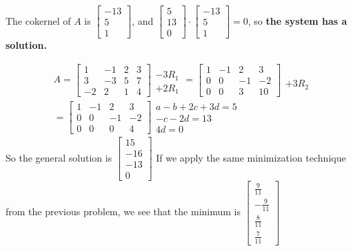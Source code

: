 \documentclass[10pt,letterpaper]{article}
\begin{document}
	The cokernel of $A$ is $\begin{bmatrix}
	-13 \\ 5 \\ 1
	\end{bmatrix}$, and $\begin{bmatrix}
	5 \\ 13 \\ 0 
	\end{bmatrix} \cdot \begin{bmatrix}
	-13 \\ 5 \\ 1
	\end{bmatrix} = 0$, so \textbf{the system has a solution.}
	
	\begin{align*}
		& A = \begin{bmatrix}
		1 & -1 & 2 & 3 \\ 3 & -3 & 5 & 7 \\ -2 & 2 & 1 & 4
		\end{bmatrix} \begin{array}{c}
		\\ -3R_1 \\ +2R_1
		\end{array} =  \begin{bmatrix}
		1 & -1 & 2 & 3 \\ 0 & 0 & -1 & -2 \\ 0 & 0 & 3 & 10
		\end{bmatrix} \begin{array}{c}
		\\ \\ +3 R_2
		\end{array} \\
		&= \begin{bmatrix}
		1 & -1 & 2 & 3 \\ 0 & 0 & -1 & -2 \\ 0 & 0 & 0 & 4
		\end{bmatrix} \begin{array}{c}
		a - b + 2c + 3d = 5 \\ -c - 2d = 13 \\ 4d = 0
		\end{array}
	\end{align*}
	So the general solution is $\begin{bmatrix}
	15 \\ -16 \\ -13 \\ 0
	\end{bmatrix}$ 
	If we apply the same minimization technique from the previous problem, we see that the minimum is $\boxed{\begin{bmatrix}
		\frac{9}{11} \\ -\frac{9}{11} \\ \frac{8}{11} \\ \frac{7}{11}
		\end{bmatrix}}$
\end{document}
